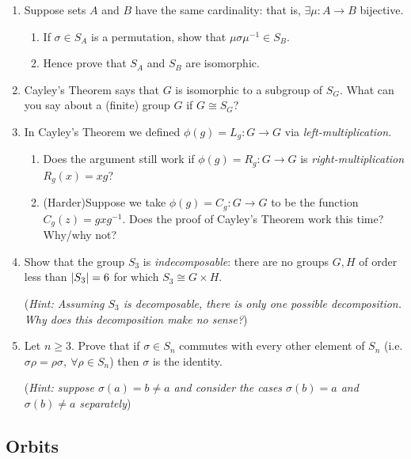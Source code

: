 \begin{exercises}
\begin{enumerate}
		
	  \item\label{exs:symmwd} Suppose sets $A$ and $B$ have the same cardinality: that is, $\exists \mu:A\to B$ bijective.
	  \begin{enumerate}
	    \item If $\sigma\in S_A$ is a permutation, show that $\mu\sigma\mu^{-1}\in S_B$.
	    \item Hence prove that $S_A$ and $S_B$ are isomorphic.
	  \end{enumerate}
	  
	  
	  \item Cayley's Theorem says that $G$ is isomorphic to a subgroup of $S_G$.  What can you say about a (finite) group $G$ if $G\cong S_G$?
	
	  
	  \item In Cayley's Theorem we defined $\phi(g)=L_g:G\to G$ via \emph{left-multiplication.}
	  \begin{enumerate}
	    \item Does the argument still work if $\phi(g)=R_g:G\to G$ is \emph{right-multiplication} $R_g(x)=xg$?
	    
	    \item (Harder)\lstsp Suppose we take $\phi(g)=C_g:G\to G$ to be the function $C_g(z)=gx g^{-1}$. Does the proof of Cayley's Theorem work this time? Why/why not?
	  \end{enumerate}
		
		
		\item Show that the group $S_3$ is \emph{indecomposable}: there are no groups $G,H$ of order less than $\left| S_3\right|=6$ for which $S_3\cong G\times H$.\par
		(\emph{Hint: Assuming $S_3$ is decomposable, there is only one possible decomposition. Why does this decomposition make no sense?})
	  
	  
	  \item\label{exs:centerSn} Let $n\ge 3$. Prove that if $\sigma\in S_n$ commutes with every other element of $S_n$ (i.e. $\sigma\rho=\rho\sigma,\ \forall \rho\in S_n$) then $\sigma$ is the identity.\par
	  (\emph{Hint: suppose $\sigma(a)=b\neq a$ and consider the cases $\sigma(b)=a$ and $\sigma(b)\neq a$ separately})
	
	\end{enumerate}
\end{exercises}


\clearpage


\subsection{Orbits}\label{sec:orbits}

